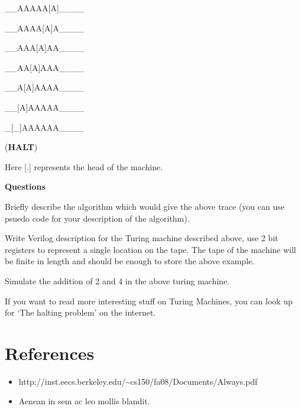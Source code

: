\documentclass[a4paper,10pt]{article}
\theoremstyle{mytheor}
\begin{document}
{\begin{legal}
    \item \begin{textsc}\_\_AAAAA[A]\_\_\_\_\end{textsc}
    \item \begin{textsc}\_\_AAAA[A]A\_\_\_\_\end{textsc}
    \item \begin{textsc}\_\_AAA[A]AA\_\_\_\_\end{textsc}
    \item \begin{textsc}\_\_AA[A]AAA\_\_\_\_\end{textsc}
    \item \begin{textsc}\_\_A[A]AAAA\_\_\_\_\end{textsc}
    \item \begin{textsc}\_\_[A]AAAAA\_\_\_\_\end{textsc}
    \item \begin{textsc}\_[\_]AAAAAA\_\_\_\_\end{textsc} (\textbf{HALT})
    \end{legal}

    Here \textsc{[.]} represents the head of the machine.
    
    \textbf{Questions}
    \begin{legal}
    \item Briefly describe the algorithm which would give the above
      trace (you can use psuedo code for your description of the
      algorithm).
    \item Write Verilog description for the Turing machine described
      above, use 2 bit registers to represent a single location on the
      tape. The tape of the machine will be finite in length and
      should be enough to store the above example.
    \item Simulate the addition of 2 and 4 in the above turing
      machine.
    \end{legal}
  If you want to read more interesting stuff on Turing Machines, you
  can look up for `The halting problem' on the internet.
 }

 \pagebreak
\section*{References}
\begin{itemize}
  \small
\item
  http://inst.eecs.berkeley.edu/{\textasciitilde}cs150/fa08/Documents/Always.pdf
\item Aenean in sem ac leo mollis blandit.
\end{itemize}
\end{document}
